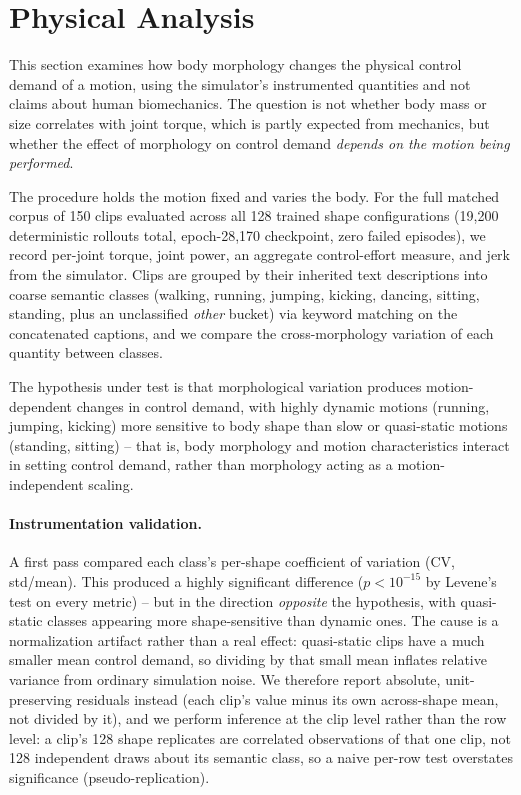 \section{Physical Analysis}\label{sec:physics}

This section examines how body morphology changes the physical control
demand of a motion, using the simulator's instrumented quantities and not
claims about human biomechanics. The question is not whether body mass or
size correlates with joint torque, which is partly expected from mechanics,
but whether the effect of morphology on control demand \emph{depends on the
motion being performed}.

The procedure holds the motion fixed and varies the body. For the full
matched corpus of 150 clips evaluated across all 128 trained shape
configurations (19,200 deterministic rollouts total, epoch-28,170
checkpoint, zero failed episodes), we record per-joint torque, joint power,
an aggregate control-effort measure, and jerk from the simulator. Clips are
grouped by their inherited text descriptions into coarse semantic classes
(walking, running, jumping, kicking, dancing, sitting, standing, plus an
unclassified \emph{other} bucket) via keyword matching on the concatenated
captions, and we compare the cross-morphology variation of each quantity
between classes.

The hypothesis under test is that morphological variation produces
motion-dependent changes in control demand, with highly dynamic motions
(running, jumping, kicking) more sensitive to body shape than slow or
quasi-static motions (standing, sitting) -- that is, body morphology and
motion characteristics interact in setting control demand, rather than
morphology acting as a motion-independent scaling.

\paragraph{Instrumentation validation.} A first pass compared each class's
per-shape coefficient of variation (CV, std/mean). This produced a
highly significant difference ($p<10^{-15}$ by Levene's test on every
metric) -- but in the direction \emph{opposite} the hypothesis, with
quasi-static classes appearing more shape-sensitive than dynamic ones. The
cause is a normalization artifact rather than a real effect: quasi-static
clips have a much smaller mean control demand, so dividing by that small
mean inflates relative variance from ordinary simulation noise. We therefore
report absolute, unit-preserving residuals instead (each clip's value minus
its own across-shape mean, not divided by it), and we perform inference at
the clip level rather than the row level: a clip's 128 shape replicates are
correlated observations of that one clip, not 128 independent draws about
its semantic class, so a naive per-row test overstates significance
(pseudo-replication).

